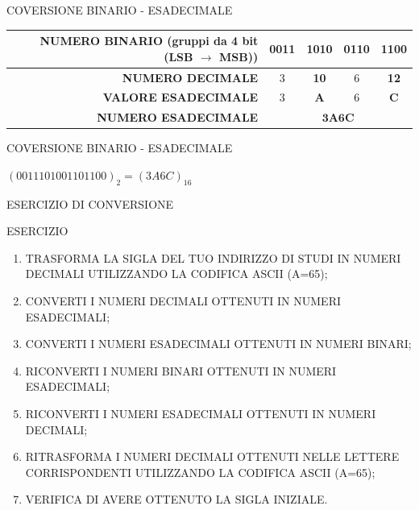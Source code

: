 \documentclass[aspectratio=1610]{beamer}
\begin{document}
\begin{frame}{COVERSIONE BINARIO - ESADECIMALE}
    \centering
    \begin{tabular}{r||c|c|c|c}
        \textbf{NUMERO BINARIO (gruppi da 4 bit (LSB $\rightarrow$ MSB))} & 0011 & 1010 & 0110 & 1100 \\
        \hline
        \pause
        \textbf{NUMERO DECIMALE} & 3 & \textbf{10} & 6 & \textbf{12} \\
        \hline
        \pause
        \textbf{VALORE ESADECIMALE} & 3 & \textbf{A} & 6 & \textbf{C} \\
        \hline
        \pause
        \textbf{NUMERO ESADECIMALE} & \multicolumn{4}{c}{$\mathbf{3A6C}$} \\
    \end{tabular}
    \begin{alertblock}{COVERSIONE BINARIO - ESADECIMALE}
        \begin{minipage}{0.98\linewidth}
            \centering
            \huge
            $(0011101001101100)_{2} = (3A6C)_{16}$
        \end{minipage}
    \end{alertblock}
\end{frame}

\begin{frame}{ESERCIZIO DI CONVERSIONE}
    \begin{alertblock}{ESERCIZIO}
        \begin{minipage}{0.98\linewidth}
            \begin{enumerate}
                \justifying
                \item TRASFORMA LA SIGLA DEL TUO INDIRIZZO DI STUDI IN NUMERI DECIMALI UTILIZZANDO LA CODIFICA ASCII (A=65);
                \item CONVERTI I NUMERI DECIMALI OTTENUTI IN NUMERI ESADECIMALI;
                \item CONVERTI I NUMERI ESADECIMALI OTTENUTI IN NUMERI BINARI;
                \item RICONVERTI I NUMERI BINARI OTTENUTI IN NUMERI ESADECIMALI;
                \item RICONVERTI I NUMERI ESADECIMALI OTTENUTI IN NUMERI DECIMALI;
                \item RITRASFORMA I NUMERI DECIMALI OTTENUTI NELLE LETTERE CORRISPONDENTI UTILIZZANDO LA CODIFICA ASCII (A=65);
                \item VERIFICA DI AVERE OTTENUTO LA SIGLA INIZIALE.
            \end{enumerate}
        \end{minipage}
    \end{alertblock}
\end{frame}
\end{document}
